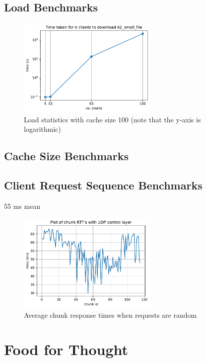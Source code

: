 \documentclass[12pt]{article}
\begin{document}
\subsection{Load Benchmarks}

\begin{figure}[H]
  \centering
  \includegraphics[width=0.6\textwidth]{time_clients.pdf}
  \caption{Load statistics with cache size 100 (note that the y-axis is logarithmic)}
\end{figure}

\subsection{Cache Size Benchmarks}



\subsection{Client Request Sequence Benchmarks}

55 ms mean

\begin{figure}[H]
  \centering
  \includegraphics[width=0.6\textwidth]{random_req.pdf}
  \caption{Average chunk response times when requests are random}
\end{figure}

\section{Food for Thought}
\end{document}
